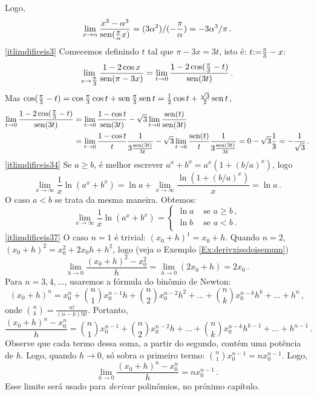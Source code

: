 \begin{exo}
\begin{sol}
Logo,
$$
\lim_{x\to \alpha}\frac{x^3-\alpha^3}{\operatorname{sen}
(\tfrac{\pi}{\alpha}x)}=(3\alpha^2)/ (-\frac{\pi}{\alpha})=-3\alpha^3/ \pi\,.
$$
\eqref{itlimdificeis3} Comecemos definindo $t$ tal que $\pi-3x=3t$, isto é:
$t{:=} \tfrac{\pi}{3}-x$:
$$\lim_{x\to \tfrac{\pi}{3}}\frac{1-2\cos
x}{\operatorname{sen}(\pi-3x)}=\lim_{t\to 0}\frac{1-2\cos (\tfrac{\pi}{3}-t)}{\operatorname{sen} (3t)}\,.$$
Mas $\cos (\tfrac{\pi}{3}-t)=\cos \tfrac{\pi}{3}\cos t+\operatorname{sen} \tfrac{\pi}{3}\operatorname{sen}
t=\frac12\cos t+\frac{\sqrt{3}}{2}\operatorname{sen} t$,
\begin{align*}
\lim_{t\to 0}\frac{1-2\cos (\tfrac{\pi}{3}-t)}{\operatorname{sen} (3t)}&=
\lim_{t\to 0}\frac{1-\cos t}{\operatorname{sen} (3t)}-\sqrt{3}\lim_{t\to 0}\frac{\operatorname{sen}
(t)}{\operatorname{sen} (3t)}\\
&=\lim_{t\to 0}\frac{1-\cos t}{t}\frac{1}{
3\frac{\operatorname{sen} (3t)}{3t}}-
\sqrt{3}\lim_{t\to
0}\frac{\operatorname{sen} (t)}{t}\frac{1}{3\frac{\operatorname{sen}
(3t)}{3t}}=0-\sqrt{3}\frac{1}{3}=-\frac{1}{\sqrt{3}}\,.
\end{align*}
\eqref{itlimdificeis34}
Se $a\geq b$, é melhor escrever $a^x+b^x=a^x(1+(b/a)^x)$, logo
\[ 
\lim_{x\to\infty}\frac{1}{x}\ln(a^x+b^x)
=\ln a+ 
\lim_{x\to\infty}\frac{\ln(1+(b/a)^x)}{x}
=\ln a\,.
\]
O caso $a<b$ se trata da mesma maneira. Obtemos:
\[ 
\lim_{x\to\infty}\frac{1}{x}\ln(a^x+b^x)
=
\begin{cases}
\ln a&\text{ se }a\geq b\,,\\
\ln b&\text{ se }a< b\,.\\
\end{cases}
\]
\eqref{itlimdificeis37}
O caso $n=1$ é trivial: $(x_0+h)^1=x_0+h$. Quando $n=2$, 
$(x_0+h)^2=x_0^2+2x_0h+h^2$, logo (veja o Exemplo
\ref{Ex:derivxissdoisemum})
$$
\lim_{h\to 0}\frac{(x_0+h)^2-x_0^2}{h}=
\lim_{h\to 0}(2x_0+h)=2x_0\,.
$$
Para $n=3,4,\dots$, usaremos a fórmula do binômio de
Newton:
$$(x_0+h)^n=x_0^n+\binom{n}{1}x_0^{n-1}h+\binom{n}{2}x_0^{n-2}
h^2+\dots+\binom{n}{k}x_0^{n-k} h^k+\dots+h^n\,,
$$
onde $\binom{n}{k}=\frac{n!}{(n-k)!k!}$. Portanto,
$$
\frac{(x_0+h)^n-x_0^n}{h}=\binom{n}{1}x_0^{n-1}+\binom{n}{2}x_0^{n-2}
h+\dots+\binom{n}{k}x_0^{n-k} h^{k-1}+\dots+h^{n-1}\,.
$$
Observe que cada termo dessa soma, a partir do segundo, contém
uma potência de $h$. Logo, quando $h\to 0$, só sobra 
o primeiro termo: $\binom{n}{1}x_0^{n-1}=nx_0^{n-1}$. Logo,
\[
\lim_{h\to 0}\frac{(x_0+h)^n-x_0^n}{h}=nx_0^{n-1}\,.
\]
Esse limite será usado para \emph{derivar} polinômios, no próximo capítulo.
\end{sol}
\end{exo}



